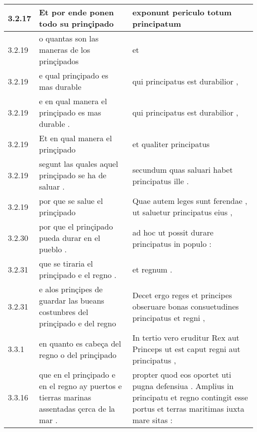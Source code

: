 \begin{tabular}{|p{1cm}|p{6.5cm}|p{6.5cm}|}
3.2.17 & Et por ende ponen todo su prinçipado & exponunt periculo totum principatum \\\hline
3.2.19 & o quantas son las maneras de los prinçipados & et \\\hline
3.2.19 & e qual prinçipado es mas durable & qui principatus est durabilior , \\\hline
3.2.19 & e en qual manera el prinçipado es mas durable . & qui principatus est durabilior , \\\hline
3.2.19 & Et en qual manera el prinçipado & et qualiter principatus \\\hline
3.2.19 & segunt las quales aquel prinçipado se ha de saluar . & secundum quas saluari habet principatus ille . \\\hline
3.2.19 & por que se salue el prinçipado & Quae autem leges sunt ferendae , ut saluetur principatus eius , \\\hline
3.2.30 & por que el prinçipado pueda durar en el pueblo . & ad hoc ut possit durare principatus in populo : \\\hline
3.2.31 & que se tiraria el prinçipado e el regno . & et regnum . \\\hline
3.2.31 & e alos prinçipes de guardar las bueans costunbres del prinçipado e del regno & Decet ergo reges et principes obseruare bonas consuetudines principatus et regni , \\\hline
3.3.1 & en quanto es cabeça del regno o del prinçipado & In tertio vero eruditur Rex aut Princeps ut est caput regni aut principatus , \\\hline
3.3.16 & que en el prinçipado e en el regno ay puertos e tierras marinas assentadas çerca de la mar . & propter quod eos oportet uti pugna defensiua . Amplius in principatu et regno contingit esse portus et terras maritimas iuxta mare sitas : \\\hline

\end{tabular}

